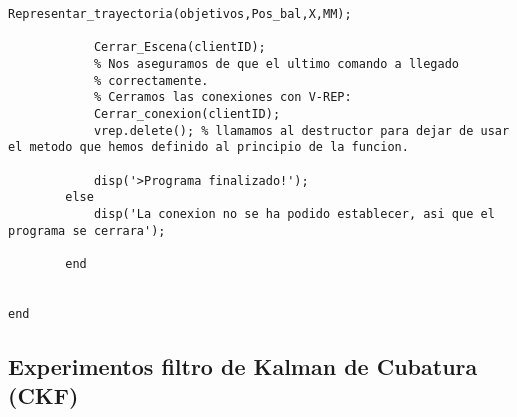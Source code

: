 \begin{lstlisting}[frame=single]
            Representar_trayectoria(objetivos,Pos_bal,X,MM);
            
            Cerrar_Escena(clientID);
            % Nos aseguramos de que el ultimo comando a llegado
            % correctamente.
            % Cerramos las conexiones con V-REP:	
            Cerrar_conexion(clientID);
            vrep.delete(); % llamamos al destructor para dejar de usar el metodo que hemos definido al principio de la funcion.

            disp('>Programa finalizado!');
        else
            disp('La conexion no se ha podido establecer, asi que el programa se cerrara');

        end

    
end
\end{lstlisting}
\subsection{Experimentos filtro de Kalman de Cubatura (CKF)}
